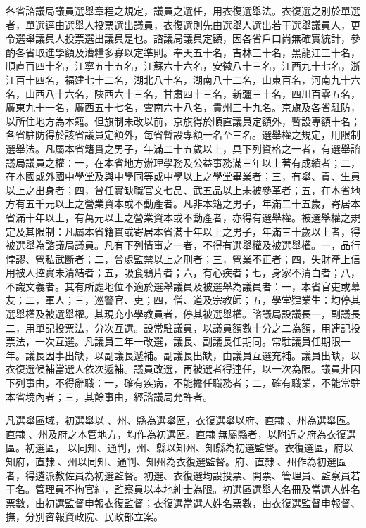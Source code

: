 \begin{pinyinscope}
各省諮議局議員選舉章程之規定，議員之選任，用衣復選舉法。衣復選之別於單選者，單選逕由選舉人投票選出議員，衣復選則先由選舉人選出若干選舉議員人，更令選舉議員人投票選出議員是也。諮議局議員定額，因各省戶口尚無確實統計，參酌各省取進學額及漕糧多寡以定準則。奉天五十名，吉林三十名，黑龍江三十名，順直百四十名，江寧五十五名，江蘇六十六名，安徽八十三名，江西九十七名，浙江百十四名，福建七十二名，湖北八十名，湖南八十二名，山東百名，河南九十六名，山西八十六名，陜西六十三名，甘肅四十三名，新疆三十名，四川百零五名，廣東九十一名，廣西五十七名，雲南六十八名，貴州三十九名。京旗及各省駐防，以所住地方為本籍。但旗制未改以前，京旗得於順直議員定額外，暫設專額十名；各省駐防得於該省議員定額外，每省暫設專額一名至三名。選舉權之規定，用限制選舉法。凡屬本省籍貫之男子，年滿二十五歲以上，具下列資格之一者，有選舉諮議局議員之權：一，在本省地方辦理學務及公益事務滿三年以上著有成績者；二，在本國或外國中學堂及與中學同等或中學以上之學堂畢業者；三，有舉、貢、生員以上之出身者；四，曾任實缺職官文七品、武五品以上未被參革者；五，在本省地方有五千元以上之營業資本或不動產者。凡非本籍之男子，年滿二十五歲，寄居本省滿十年以上，有萬元以上之營業資本或不動產者，亦得有選舉權。被選舉權之規定及其限制：凡屬本省籍貫或寄居本省滿十年以上之男子，年滿三十歲以上者，得被選舉為諮議局議員。凡有下列情事之一者，不得有選舉權及被選舉權。一，品行悖謬、營私武斷者；二，曾處監禁以上之刑者；三，營業不正者；四，失財產上信用被人控實未清結者；五，吸食鴉片者；六，有心疾者；七，身家不清白者；八，不識文義者。其有所處地位不適於選舉議員及被選舉為議員者：一，本省官吏或幕友；二，軍人；三，巡警官、吏；四，僧、道及宗教師；五，學堂肄業生：均停其選舉權及被選舉權。其現充小學教員者，停其被選舉權。諮議局設議長一，副議長二，用單記投票法，分次互選。設常駐議員，以議員額數十分之二為額，用連記投票法，一次互選。凡議員三年一改選，議長、副議長任期同。常駐議員任期限一年。議長因事出缺，以副議長遞補。副議長出缺，由議員互選充補。議員出缺，以衣復選候補當選人依次遞補。議員改選，再被選者得連任，以一次為限。議員非因下列事由，不得辭職：一，確有疾病，不能擔任職務者；二，確有職業，不能常駐本省境內者；三，其餘事由，經諮議局允許者。

凡選舉區域，初選舉以、州、縣為選舉區，衣復選舉以府、直隸、州為選舉區。直隸、州及府之本管地方，均作為初選區。直隸無屬縣者，以附近之府為衣復選區。初選區，以同知、通判，州、縣以知州、知縣為初選監督。衣復選區，府以知府，直隸、州以同知、通判、知州為衣復選監督。府、直隸、州作為初選區者，得遴派教佐員為初選監督。初選、衣復選均設投票、開票、管理員、監察員若干名。管理員不拘官紳，監察員以本地紳士為限。初選區選舉人名冊及當選人姓名票數，由初選監督申報衣復監督；衣復選當選人姓名票數，由衣復選監督申報督、撫，分別咨報資政院、民政部立案。


\end{pinyinscope}
